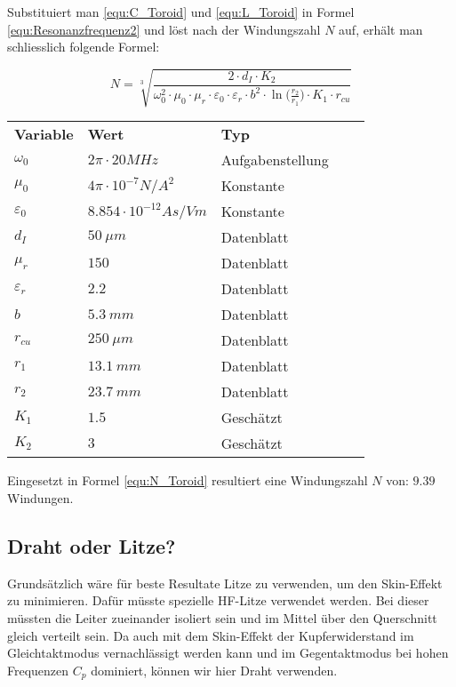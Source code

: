 Substituiert man \ref{equ:C_Toroid} und \ref{equ:L_Toroid} in Formel \ref{equ:Resonanzfrequenz2} und löst nach der Windungszahl $N$ auf, erhält man schliesslich folgende Formel:

\begin{equation}
N = \sqrt[3]{\frac{2\cdot d_{I}\cdot K_{2}}{\omega_{0}^{2}\cdot \mu_{0}\cdot \mu_{r}\cdot \varepsilon_{0}\cdot \varepsilon_{r}\cdot b^{2}\cdot \ln \Big(\frac{r_{2}}{r_{1}}\Big)\cdot K_{1}\cdot r_{cu}}}
\label{equ:N_Toroid}
\end{equation}

\begin{table}[H]
	\centering
	\begin{tabular}{|l|l|l|ll}
		\cline{1-3}
		\textbf{Variable} & \textbf{Wert} & \textbf{Typ} &  &  \\ \cline{1-3}
	$\omega_{0}$	&   $2\pi\cdot 20MHz$        &     Aufgabenstellung      &  &  \\ \cline{1-3}
	$\mu_{0}$	&     $4\pi\cdot 10^{-7} N/A^{2}$      &  Konstante         &  &  \\ \cline{1-3}
	$\varepsilon_{0}$	&  $8.854\cdot 10^{-12} As/Vm $         &     Konstante      &  &  \\ \cline{1-3}
	$d_{I}$	&  $\SI{50}{\mu m}$         &     Datenblatt      &  &  \\ \cline{1-3}
	$\mu_{r}$	&  $150$         &     Datenblatt      &  &  \\ \cline{1-3}
	$\varepsilon_{r}$	&  $2.2$         &     Datenblatt      &  &  \\ \cline{1-3}
	$b$	&  $\SI{5.3}{mm}$         &     Datenblatt      &  &  \\ \cline{1-3}
	$r_{cu}$	&  $\SI{250}{\mu m}$         &     Datenblatt      &  &  \\ \cline{1-3}
	$r_{1}$	&  $\SI{13.1}{mm}$         &     Datenblatt      &  &  \\ \cline{1-3}
	$r_{2}$	&  $\SI{23.7}{mm}$         &     Datenblatt      &  &  \\ \cline{1-3}
	$K_{1}$	&  $1.5$         &     Geschätzt      &  &  \\ \cline{1-3}
	$K_{2}$	&  $3$         &     Geschätzt      &  &  \\ \cline{1-3}
	\end{tabular}
\end{table}

Eingesetzt in Formel \ref{equ:N_Toroid} resultiert eine Windungszahl $N$ von: $9.39$ Windungen.

\subsection{Draht oder Litze?}
Grundsätzlich wäre für beste Resultate Litze zu verwenden, um den Skin-Effekt zu minimieren. Dafür müsste spezielle HF-Litze verwendet werden. Bei dieser müssten die Leiter zueinander isoliert sein und im Mittel über den Querschnitt gleich verteilt sein. Da auch mit dem Skin-Effekt der Kupferwiderstand im Gleichtaktmodus vernachlässigt werden kann und im Gegentaktmodus bei hohen Frequenzen $C_{p}$ dominiert, können wir hier Draht verwenden.





